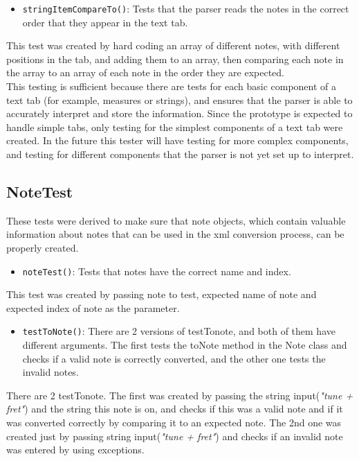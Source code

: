 \documentclass[11pt]{article}
\begin{document}
\begin{itemize}
\item \texttt{stringItemCompareTo()}: Tests that the parser reads the notes in the correct order that they appear in the text tab.\\
\end{itemize}
This test was created by hard coding an array of different notes, with different positions in the tab, and adding them to an array, then comparing each note in the array to an array of each note in the order they are expected.\\

This testing is sufficient because there are tests for each basic component of a text tab (for example, measures or strings), and ensures that the parser is able to accurately interpret and store the information. Since the prototype is expected to handle simple tabs, only testing for the simplest components of a text tab were created. In the future this tester will have testing for more complex components, and testing for different components that the parser is not yet set up to interpret.\\
\subsection{NoteTest}
\label{sec:orgd1d94e7}
These tests were derived to make sure that note objects, which contain valuable information about notes that can be used in the xml conversion process, can be properly created.\\
\begin{itemize}
\item \texttt{noteTest()}: Tests that notes have the correct name and index.\\
\end{itemize}
This test was created by passing note to test, expected name of note and expected index of note as the parameter.\\
\begin{itemize}
\item \texttt{testToNote()}: There are 2 versions of testTonote, and both of them have different arguments. The first tests the toNote method in the Note class and checks if a valid note is correctly converted, and the other one tests the invalid notes.\\
\end{itemize}
There are 2 testTonote. The first was created by passing the string input(\emph{"tune + fret"}) and the string this note is on, and checks if this was a valid note and if it was converted correctly by comparing it to an expected note. The 2nd one was created just by passing string input(\emph{"tune + fret"}) and checks if an invalid note was entered by using exceptions.\\
\end{document}
